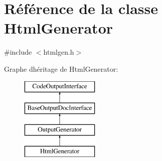 \hypertarget{class_html_generator}{}\section{Référence de la classe Html\+Generator}
\label{class_html_generator}


{\ttfamily \#include $<$htmlgen.\+h$>$}

Graphe d\textquotesingle{}héritage de Html\+Generator\+:\begin{figure}[H]
\begin{center}
\leavevmode
\includegraphics[height=4.000000cm]{class_html_generator}
\end{center}
\end{figure}
